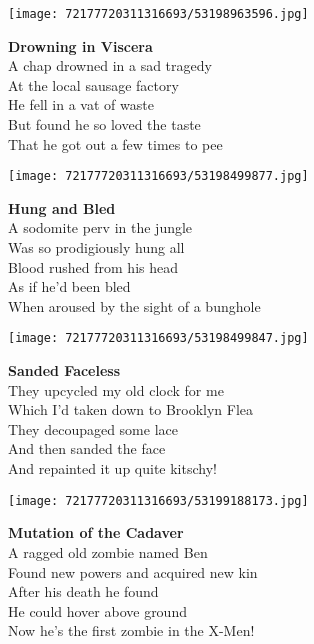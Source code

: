\documentclass[10pt,letterpaper]{article}
\begin{document}
\begin{center}\texttt{[image: 72177720311316693/53198963596.jpg]}
\end{center}
\begin{center}
\textbf{Drowning in Viscera}\\
\vskip 0.2in
A chap drowned in a sad tragedy\\
At the local sausage factory\\
He fell in a vat of waste\\
But found he so loved the taste\\
That he got out a few times to pee\\
\end{center}
\pagebreak

\begin{center}
\texttt{[image: 72177720311316693/53198499877.jpg]}
\end{center}

\begin{center}
\textbf{Hung and Bled}\\
\vskip 0.2in
A sodomite perv in the jungle\\
Was so prodigiously hung all\\
Blood rushed from his head\\
As if he'd been bled\\
When aroused by the sight of a bunghole\\
\end{center}
\pagebreak

\begin{center}
\texttt{[image: 72177720311316693/53198499847.jpg]}
\end{center}

\begin{center}
\textbf{Sanded Faceless}\\
\vskip 0.2in
They upcycled my old clock for me\\
Which I'd taken down to Brooklyn Flea\\
They decoupaged some lace\\
And then sanded the face\\
And repainted it up quite kitschy!\\
\end{center}
\pagebreak

\begin{center}\texttt{[image: 72177720311316693/53199188173.jpg]}
\end{center}
\begin{center}
\textbf{Mutation of the Cadaver}\\
\vskip 0.2in
A ragged old zombie named Ben\\
Found new powers and acquired new kin\\
After his death he found\\
He could hover above ground\\
Now he's the first zombie in the X-Men!\\
\end{center}
\pagebreak
\end{document}
